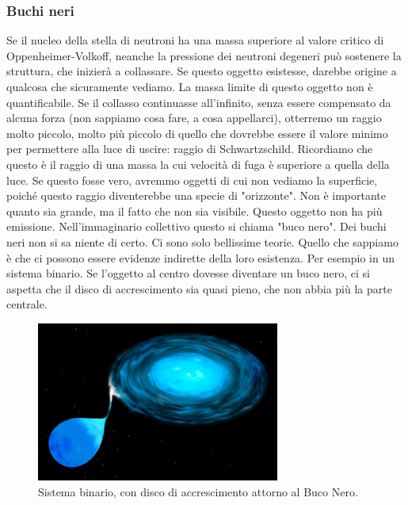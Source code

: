 \documentclass[a4paper,11pt]{article}
\begin{document}
\subsubsection{Buchi neri}
Se il nucleo della stella di neutroni ha una massa superiore al valore critico di Oppenheimer-Volkoff, neanche la pressione dei neutroni degeneri può sostenere la struttura, che inizierà a collassare. Se questo oggetto esistesse, darebbe origine a qualcosa che sicuramente vediamo. La massa limite di questo oggetto non è quantificabile. Se il collasso continuasse all'infinito, senza essere compensato da alcuna forza (non sappiamo cosa fare, a cosa appellarci), otterremo un raggio molto piccolo, molto più piccolo di quello che dovrebbe essere il valore minimo per permettere alla luce di uscire: raggio di Schwartzschild. Ricordiamo che questo è il raggio di una massa la cui velocità di fuga è superiore a quella della luce. Se questo fosse vero, avremmo oggetti di cui non vediamo la superficie, poiché questo raggio diventerebbe una specie di "orizzonte". Non è importante quanto sia grande, ma il fatto che non sia visibile. Questo oggetto non ha più emissione. Nell'immaginario collettivo questo si chiama "buco nero". Dei buchi neri non si sa niente di certo. Ci sono solo bellissime teorie. Quello che sappiamo è che ci possono essere evidenze indirette della loro esistenza. Per esempio in un sistema binario. Se l'oggetto al centro dovesse diventare un buco nero, ci si aspetta che il disco di accrescimento sia quasi pieno, che non abbia più la parte centrale. 
\begin{figure}[h!!]
        \centering
        \includegraphics[width=8cm]{lezione 28 novembre/discobuconero.png}
        \caption{Sistema binario, con disco di accrescimento attorno al Buco Nero.}
        \label{lezione 28 novembre/discobuconero.png}
    \end{figure}
    \\
\end{document}
